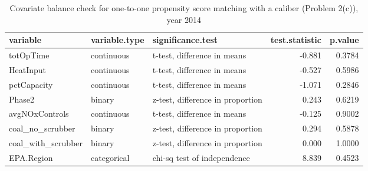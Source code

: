 \begin{enumerate}[(a)]
  \begin{table}[ht]
    \centering
    \begin{tabular}{lllrr}
      \toprule
      variable & variable.type & significance.test & test.statistic & p.value \\ 
      \midrule
      totOpTime & continuous & t-test, difference in means & -0.881 & 0.3784 \\ 
      HeatInput & continuous & t-test, difference in means & -0.527 & 0.5986 \\ 
      pctCapacity & continuous & t-test, difference in means & -1.071 & 0.2846 \\ 
      Phase2 & binary & z-test, difference in proportion & 0.243 & 0.6219 \\ 
      avgNOxControls & continuous & t-test, difference in means & -0.125 & 0.9002 \\ 
      coal\_no\_scrubber & binary & z-test, difference in proportion & 0.294 & 0.5878 \\ 
      coal\_with\_scrubber & binary & z-test, difference in proportion & 0.000 & 1.0000 \\ 
      EPA.Region & categorical & chi-sq test of independence & 8.839 & 0.4523 \\ 
      \bottomrule
    \end{tabular}
    \caption{Covariate balance check for one-to-one propensity score matching with a caliber (Problem 2(c)), year 2014} 
    \label{tab-bal2c-14}
  \end{table}




\end{enumerate}
